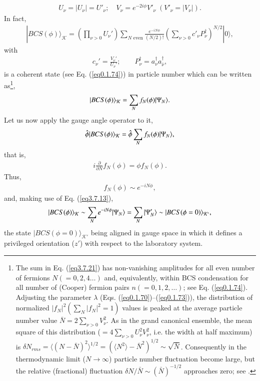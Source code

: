 \begin{align}
U_\nu=|U_\nu|=U'_\nu;\quad V_\nu=e^{-2i\phi}V'_\nu \;(V'_\nu=|V_\nu|).
\end{align}
In fact, 
\begin{align}\label{eq3.7.19}
|BCS(\phi)\rangle_{\mathcal{K}}=\left(\prod_{\nu>0}U_\nu'\right)\sum_{N\text{ even}}\frac{e^{-iN\phi}}{(N/2)!}\left(\sum_{\nu>0}c'_\nu P^\dagger_\nu\right)^{N/2}|0\rangle,
\end{align}
with
\begin{align}
c_\nu'=\frac{V_\nu'}{U_\nu'};\quad \quad P^\dagger_\nu=a^\dagger_\nu a^\dagger_{\bar\nu},
\end{align}
is a coherent state (see Eq. (\ref{eq0.1.74})) in particle number which can be written as\footnote{The sum in Eq. (\ref{eq3.7.21}) has non-vanishing amplitudes for all even number of fermions $N(=0,2,4\dots)$ and, equivalently, within BCS condensation for all number of (Cooper) fermion pairs $n(=0,1,2,\dots)$; see Eq. (\ref{eq0.1.74}). Adjusting the parameter $\lambda$ (Eqs. (\ref{eq0.1.70})--(\ref{eq0.1.73})), the distribution of normalized $|f_N|^2(\sum_N |f_N|^2=1)$ values is peaked at the average particle number value $\bar N=2\sum_{\nu>0}V_\nu^2$. As in the grand canonical ensemble, the mean square of this distribution ($=4\sum_{\nu>0}U_\nu^2V_\nu^2$, i.e. the width at half maximum) is $\delta N_{rms}=\langle(N-\bar N)^2\rangle^{1/2}=(\langle N^2\rangle-\bar N^2)^{1/2}\sim\sqrt{\bar N}$. Consequently in the thermodynamic limit ($N\to\infty$) particle number fluctuation become large, but the relative (fractional) fluctuation $\delta N/\bar N\sim(\bar N)^{-1/2}$ approaches zero; see \cite{Schrieffer:64,Tinkham:96,DeGennes:66}.},
\begin{align}\label{eq3.7.21}
|{BCS(\phi)} \rangle_{\mathcal K}=\sum_N f_N(\phi)|{\Psi_N} \rangle.
\end{align}
Let us now apply the gauge angle operator to it,
\begin{align}
\hat{\phi}|{BCS(\phi)} \rangle_{\mathcal K}=\hat{\phi}\sum_{N}f_N(\phi)|{\Psi_N} \rangle,
\end{align}
that is,
\begin{align}
i\frac{\partial}{\partial N}f_N(\phi)=\phi f_N(\phi).
\end{align}
Thus,
\begin{align}
f_N(\phi)\sim e^{-iN\phi},
\end{align}
and, making use of Eq. (\ref{eq3.7.13}),
\begin{align}\label{eq4.7.25}
|{BCS(\phi)} \rangle_{\mathcal K}\sim \sum_{N} e^{-iN\phi}|{\Psi_N} \rangle=\sum_N |{\Psi'_{N}} \rangle\sim|{BCS(\phi=0)} \rangle_{\mathcal K'},
\end{align}
 the state $|BCS(\phi=0)\rangle_{\mathcal{K}'}$ being aligned in gauge space in which it defines a privileged orientation ($z'$) with respect to the laboratory system.


